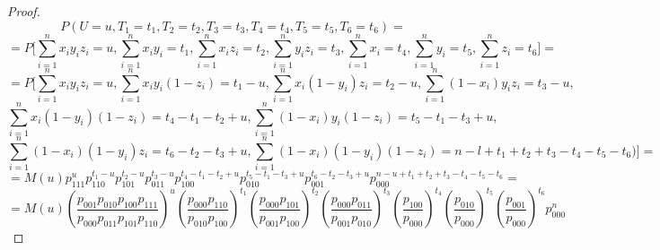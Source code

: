 \documentclass{article}
\theoremstyle{definition}
\begin{document}
\begin{proof}
    $$
        P(U=u, T_1=t_1, T_2=t_2, T_3=t_3, T_4=t_4, T_5=t_5, T_6=t_6)=
    $$
    $$
        =P\biggl[\sum_{i=1}^n x_i y_i z_i=u, \sum_{i=1}^n x_i y_i=t_1, \sum_{i=1}^n x_i z_i=t_2,\sum_{i=1}^n y_i z_i=t_3,
            \sum_{i=1}^n x_i=t_4,\sum_{i=1}^n y_i=t_5, \sum_{i=1}^n z_i=t_6\biggr]=
    $$
    $$
        =P\biggl[\sum_{i=1}^n x_i y_i z_i=u, \sum_{i=1}^n x_i y_i (1- z_i)=t_1-u, \sum_{i=1}^n x_i (1-y_i) z_i=t_2-u, \sum_{i=1}^n (1-x_i) y_i z_i=t_3-u,
            $$
            $$
            \sum_{i=1}^{n} x_i(1-y_i)(1-z_i)=t_4-t_1-t_2+u, \sum_{i=1}^{n} (1-x_i)y_i(1-z_i)=t_5-t_1-t_3+u,
            $$
            $$
            \sum_{i=1}^{n} (1-x_i)(1-y_i)z_i = t_6 - t_2 - t_3 + u,
            \sum_{i=1}^n (1-x_i)(1-y_i)(1-z_i)=n-l+t_1+t_2+t_3-t_4-t_5-t_6)\biggr]=
    $$
    $$
        = M(u) p_{111}^u p_{110}^{t_1-u} p_{101}^{t_2-u} p_{011}^{t_3-u}
        p_{100}^{t_4-t_1-t_2+u} p_{010}^{t_5-t_1-t_3+u} p_{001}^{t_6 - t_2 - t_3 + u}
        p_{000}^{n-u+t_1+t_2+t_3-t_4-t_5-t_6}
        =
    $$
    $$
        = M(u) \left(\dfrac{p_{001}p_{010}p_{100}p_{111}}{p_{000}p_{011}p_{101}p_{110}}\right)^u
        \left(\dfrac{p_{000} p_{110}}{p_{010} p_{100}}\right)^{t_1}\left(\dfrac{p_{000}p_{101}}{p_{001}p_{100}}\right)^{t_2}
        \left(\dfrac{p_{000}p_{011}}{p_{001}p_{010}}\right)^{t_3}\left(\dfrac{p_{100}}{p_{000}}\right)^{t_4}
        \left(\dfrac{p_{010}}{p_{000}}\right)^{t_5} \left(\dfrac{p_{001}}{p_{000}}\right)^{t_6} p_{000}^n
    $$
\end{proof}
\end{document}
